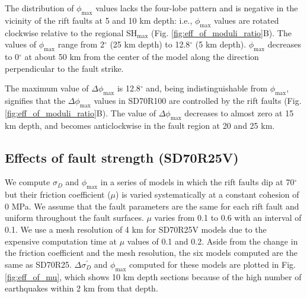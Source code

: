 \documentclass[draft]{agujournal2018}
\begin{document}
The distribution of $\phi_{\max}$ values lacks the four-lobe pattern and is negative in the vicinity of the rift faults at 5 and 10 km depth: i.e., $\phi_{\max}$ values are rotated clockwise relative to the regional SH$_{\max}$ (Fig. \ref{fig:eff_of_moduli_ratio}B). The values of $\phi_{\max}$ range from 2$^\circ$ (25 km depth) to 12.8$^\circ$ (5 km depth). $\phi_{\max}$ decreases to 0$^{\circ}$ at about 50 km from the center of the model along the direction perpendicular to the fault strike.

The maximum value of $\Delta\phi_{\max}$ is 12.8$^\circ$ and, being indistinguishable from $\phi_{\max}$, signifies that the  $\Delta\phi_{\max}$ values in SD70R100 are controlled by the rift faults (Fig. \ref{fig:eff_of_moduli_ratio}B). The value of $\Delta\phi_{\max}$ decreases to almost zero at 15 km depth, and becomes anticlockwise in the fault region at 20 and 25 km.

\subsection{Effects of fault strength (SD70R25V)}
We compute $\sigma_{D}$ and $\phi_{\max}$ in a series of models in which the rift faults dip at 70$^{\circ}$ but their friction coefficient ($\mu$) is varied systematically at a constant cohesion of 0 MPa. We assume that the fault parameters are the same for each rift fault and uniform throughout the fault surfaces. $\mu$ varies from 0.1 to 0.6 with an interval of 0.1. We use a mesh resolution of 4 km for SD70R25V models due to the expensive computation time at $\mu$ values of 0.1 and 0.2. Aside from the change in the friction coefficient and the mesh resolution, the six models computed are the same as SD70R25. $\Delta \sigma_{D}^{\prime}$ and $\phi_{\max}$ computed for these models are plotted in Fig. \ref{fig:eff_of_mu}, which shows 10 km depth sections because of the high number of earthquakes within 2 km from that depth.
\end{document}
